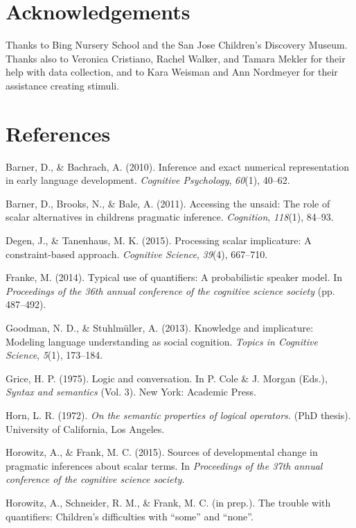 \documentclass[10pt, letterpaper]{article}
\begin{document}
\section{Acknowledgements}\label{acknowledgements}

Thanks to Bing Nursery School and the San Jose Children's Discovery
Museum. Thanks also to Veronica Cristiano, Rachel Walker, and Tamara
Mekler for their help with data collection, and to Kara Weisman and Ann
Nordmeyer for their assistance creating stimuli.

\section{References}\label{references}

\setlength{\parindent}{-0.1in} \setlength{\leftskip}{0.125in} \noindent

Barner, D., \& Bachrach, A. (2010). Inference and exact numerical
representation in early language development. \emph{Cognitive
Psychology}, \emph{60}(1), 40--62.

Barner, D., Brooks, N., \& Bale, A. (2011). Accessing the unsaid: The
role of scalar alternatives in childrens pragmatic inference.
\emph{Cognition}, \emph{118}(1), 84--93.

Degen, J., \& Tanenhaus, M. K. (2015). Processing scalar implicature: A
constraint-based approach. \emph{Cognitive Science}, \emph{39}(4),
667--710.

Franke, M. (2014). Typical use of quantifiers: A probabilistic speaker
model. In \emph{Proceedings of the 36th annual conference of the
cognitive science society} (pp. 487--492).

Goodman, N. D., \& Stuhlm{ü}ller, A. (2013). Knowledge and implicature:
Modeling language understanding as social cognition. \emph{Topics in
Cognitive Science}, \emph{5}(1), 173--184.

Grice, H. P. (1975). Logic and conversation. In P. Cole \& J. Morgan
(Eds.), \emph{Syntax and semantics} (Vol. 3). New York: Academic Press.

Horn, L. R. (1972). \emph{On the semantic properties of logical
operators.} (PhD thesis). University of California, Los Angeles.

Horowitz, A., \& Frank, M. C. (2015). Sources of developmental change in
pragmatic inferences about scalar terms. In \emph{Proceedings of the
37th annual conference of the cognitive science society.}

Horowitz, A., Schneider, R. M., \& Frank, M. C. (in prep.). The trouble
with quantifiers: Children's difficulties with ``some'' and ``none''.
\end{document}

